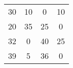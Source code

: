     \begin{tabular}{cccc}
    30      & 10      & 0       & 10 \\
    20      & 35      & 25      & 0 \\
    32      & 0       & 40      & 25 \\
    39      & 5       & 36      & 0 \bigstrut[b]\\
    \hline
    \hline
    \end{tabular}%
